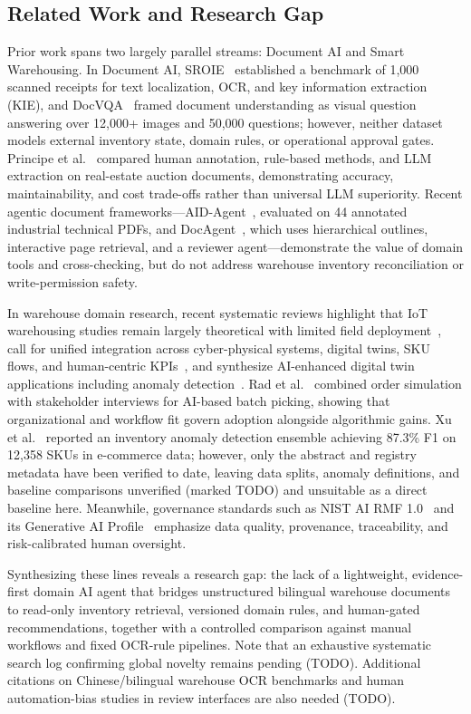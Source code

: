 \documentclass[conference]{IEEEtran}
\begin{document}
\subsection{Related Work and Research Gap}
Prior work spans two largely parallel streams: Document AI and Smart Warehousing. In Document AI, SROIE~\cite{b4} established a benchmark of 1,000 scanned receipts for text localization, OCR, and key information extraction (KIE), and DocVQA~\cite{b5} framed document understanding as visual question answering over 12,000+ images and 50,000 questions; however, neither dataset models external inventory state, domain rules, or operational approval gates. Principe et al.~\cite{b3} compared human annotation, rule-based methods, and LLM extraction on real-estate auction documents, demonstrating accuracy, maintainability, and cost trade-offs rather than universal LLM superiority. Recent agentic document frameworks---AID-Agent~\cite{b2}, evaluated on 44 annotated industrial technical PDFs, and DocAgent~\cite{b1}, which uses hierarchical outlines, interactive page retrieval, and a reviewer agent---demonstrate the value of domain tools and cross-checking, but do not address warehouse inventory reconciliation or write-permission safety.

In warehouse domain research, recent systematic reviews highlight that IoT warehousing studies remain largely theoretical with limited field deployment~\cite{b6}, call for unified integration across cyber-physical systems, digital twins, SKU flows, and human-centric KPIs~\cite{b9}, and synthesize AI-enhanced digital twin applications including anomaly detection~\cite{b10}. Rad et al.~\cite{b8} combined order simulation with stakeholder interviews for AI-based batch picking, showing that organizational and workflow fit govern adoption alongside algorithmic gains. Xu et al.~\cite{b7} reported an inventory anomaly detection ensemble achieving 87.3\% F1 on 12,358 SKUs in e-commerce data; however, only the abstract and registry metadata have been verified to date, leaving data splits, anomaly definitions, and baseline comparisons unverified (marked TODO) and unsuitable as a direct baseline here. Meanwhile, governance standards such as NIST AI RMF 1.0~\cite{b13} and its Generative AI Profile~\cite{b14} emphasize data quality, provenance, traceability, and risk-calibrated human oversight.

Synthesizing these lines reveals a research gap: the lack of a lightweight, evidence-first domain AI agent that bridges unstructured bilingual warehouse documents to read-only inventory retrieval, versioned domain rules, and human-gated recommendations, together with a controlled comparison against manual workflows and fixed OCR-rule pipelines. Note that an exhaustive systematic search log confirming global novelty remains pending (TODO). Additional citations on Chinese/bilingual warehouse OCR benchmarks and human automation-bias studies in review interfaces are also needed (TODO).
\end{document}
